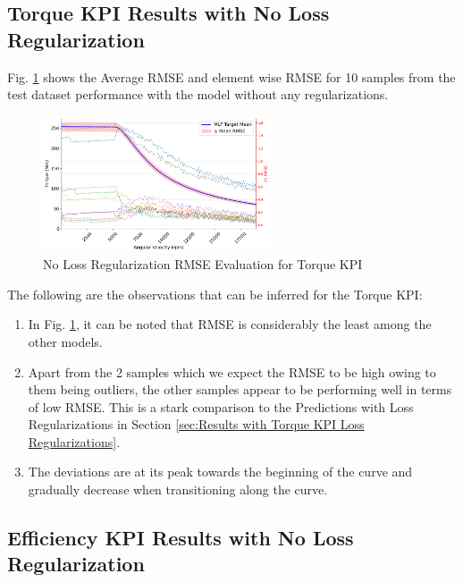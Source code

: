 \documentclass{report} %
\begin{document}
\subsection{Torque KPI Results with No Loss Regularization}\label{subsec:Torque KPI Results with No Loss Regularization}

Fig. \ref{fig:No Loss Regularization RMSE Evaluation for 2D KPI(Torque)} shows the Average \ac{RMSE} and element wise \ac{RMSE} for 10 samples from the test dataset 
performance with the model without any regularizations.

\begin{figure}[H]
    \centering
    \includegraphics[width=0.6\textwidth]{./ReportImages/RMSE_MLP_no_lossreg_y1.png} 
    \caption{No Loss Regularization \ac{RMSE} Evaluation for Torque \ac{KPI}} 
    \label{fig:No Loss Regularization RMSE Evaluation for 2D KPI(Torque)}
\end{figure}

The following are the observations that can be inferred for the Torque \ac{KPI}:
\begin{enumerate}[nosep]
    \item In Fig. \ref{fig:No Loss Regularization RMSE Evaluation for 2D KPI(Torque)}, it can be noted that \ac{RMSE} is considerably the least among the other models.
    \item Apart from the 2 samples which we expect the \ac{RMSE} to be high owing to them being outliers, the other samples appear to be performing well in terms 
    of low \ac{RMSE}. This is a stark comparison to the Predictions with Loss Regularizations in Section \ref{sec:Results with Torque KPI Loss Regularizations}.
    \item The deviations are at its peak towards the beginning of the curve and gradually decrease when transitioning along the curve.
\end{enumerate}

\subsection{Efficiency KPI Results with No Loss Regularization}\label{subsec:Efficiency Results with No Loss Regularization}
\end{document}
